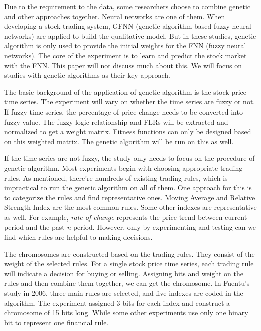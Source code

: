 \documentclass{article}
\begin{document}
Due to the requirement to the data, some researchers choose to combine genetic and other approaches together.
Neural networks are one of them.
When developing a stock trading system, GFNN (genetic-algorithm-based fuzzy neural networks)
are applied to build the qualitative model.
But in these studies, genetic algorithm is only used to provide the initial weights
for the FNN (fuzzy neural networks). \cite{an-intelligent-stock-trading-decision-support-system}
The core of the experiment is to learn and predict the stock market with the FNN.
This paper will not discuss much about this.
We will focus on studies with genetic algorithms as their key approach.

The basic background of the application of genetic algorithm is the stock price time series.
The experiment will vary on whether the time series are fuzzy or not.
If fuzzy time series, the percentage of price change needs to be converted into fuzzy value.
The fuzzy logic relationship and FLRs will be extracted and normalized to get a weight matrix. \cite{a-novel-stock-forecasting-model-based-on-fuzzy-time-series}
Fitness functions can only be designed based on this weighted matrix.
The genetic algorithm will be run on this as well.

If the time series are not fuzzy, the study only needs to focus on the procedure of genetic algorithm.
Most experiments begin with choosing appropriate trading rules.
As mentioned, there're hundreds of existing trading rules,
which is impractical to run the genetic algorithm on all of them.
One approach for this is to categorize the rules and find representative ones.
Moving Average and Relative Strength Index are the most common rules.
Some other indexes are representative as well.
For example, \emph{rate of change} represents the price trend between current period and the past \emph{n} period.
However, only by experimenting and testing can we find which rules are helpful to making decisions.

The chromosomes are constructed based on the trading rules.
They consist of the weight of the selected rules.
For a single stock price time series, each trading rule will indicate a decision for buying or selling.
Assigning bits and weight on the rules and then combine them together, we can get the chromosome.
In Fuentu's study in 2006, three main rules are selected, and five indexes are coded in the algorithm. \cite{genetic-algorithms-to-optimise-the-time-to-make-stock-market-investment}
The experiment assigned 3 bits for each index and construct a chromosome of 15 bits long.
While some other experiments use only one binary bit to represent one financial rule. \cite{stock-timing-using-genetic-algorithms}
\end{document}
